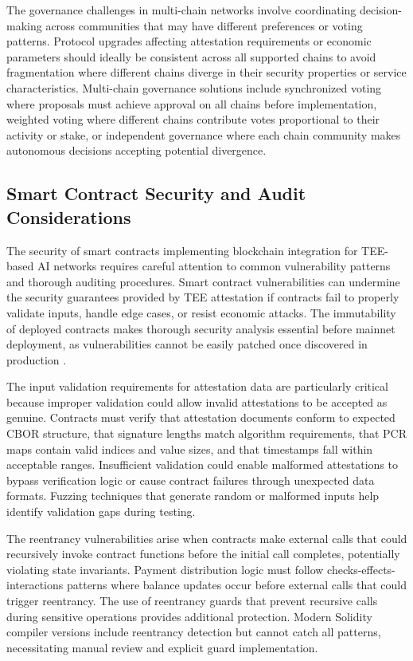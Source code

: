The governance challenges in multi-chain networks involve coordinating decision-making across communities that may have different preferences or voting patterns. Protocol upgrades affecting attestation requirements or economic parameters should ideally be consistent across all supported chains to avoid fragmentation where different chains diverge in their security properties or service characteristics. Multi-chain governance solutions include synchronized voting where proposals must achieve approval on all chains before implementation, weighted voting where different chains contribute votes proportional to their activity or stake, or independent governance where each chain community makes autonomous decisions accepting potential divergence.

\subsection{Smart Contract Security and Audit Considerations}

The security of smart contracts implementing blockchain integration for TEE-based AI networks requires careful attention to common vulnerability patterns and thorough auditing procedures. Smart contract vulnerabilities can undermine the security guarantees provided by TEE attestation if contracts fail to properly validate inputs, handle edge cases, or resist economic attacks. The immutability of deployed contracts makes thorough security analysis essential before mainnet deployment, as vulnerabilities cannot be easily patched once discovered in production \cite{smart_contracts_security}.

The input validation requirements for attestation data are particularly critical because improper validation could allow invalid attestations to be accepted as genuine. Contracts must verify that attestation documents conform to expected CBOR structure, that signature lengths match algorithm requirements, that PCR maps contain valid indices and value sizes, and that timestamps fall within acceptable ranges. Insufficient validation could enable malformed attestations to bypass verification logic or cause contract failures through unexpected data formats. Fuzzing techniques that generate random or malformed inputs help identify validation gaps during testing.

The reentrancy vulnerabilities arise when contracts make external calls that could recursively invoke contract functions before the initial call completes, potentially violating state invariants. Payment distribution logic must follow checks-effects-interactions patterns where balance updates occur before external calls that could trigger reentrancy. The use of reentrancy guards that prevent recursive calls during sensitive operations provides additional protection. Modern Solidity compiler versions include reentrancy detection but cannot catch all patterns, necessitating manual review and explicit guard implementation.

